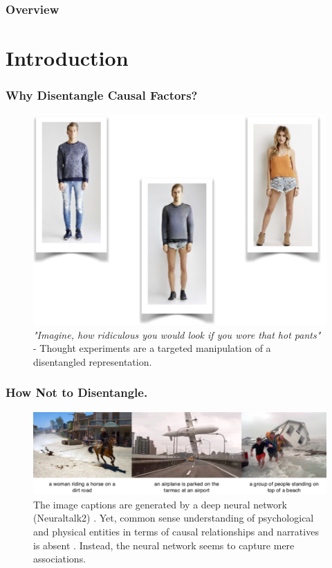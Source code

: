 \begin{frame}
\titlepage
\end{frame}

\begin{frame}
\frametitle{Overview}
\tableofcontents
\end{frame}



\section{Introduction}

	\begin{frame}
	\frametitle{Why Disentangle Causal Factors?}
		\begin{figure}[htp]
			\centering
			\includegraphics[trim={0cm 0cm 0cm 0cm},clip, width=0.4\linewidth]{fig/other/hotpants}
			\caption{\textit{"Imagine, how ridiculous you would look if you wore that hot pants"} - Thought experiments are a targeted manipulation of a disentangled representation.}
			\label{fig:hotpants}
		\end{figure}
	\end{frame}

	\begin{frame}
	\frametitle{How Not to Disentangle.}
		\begin{figure}[htp]
			\centering
			\includegraphics[trim={0cm 0cm 0cm 0cm},clip, width=1.\linewidth]{fig/other/notcausal}
			\caption{The image captions are generated by a deep neural network (Neuraltalk2) \cite{karpathy15neuraltalk}. Yet, common sense understanding of psychological and physical entities in terms of causal relationships and narratives is absent \cite{tenenbaum18think}. Instead, the neural network seems to capture mere associations.}
			\label{fig:notcausal}
		\end{figure}
	\end{frame}

